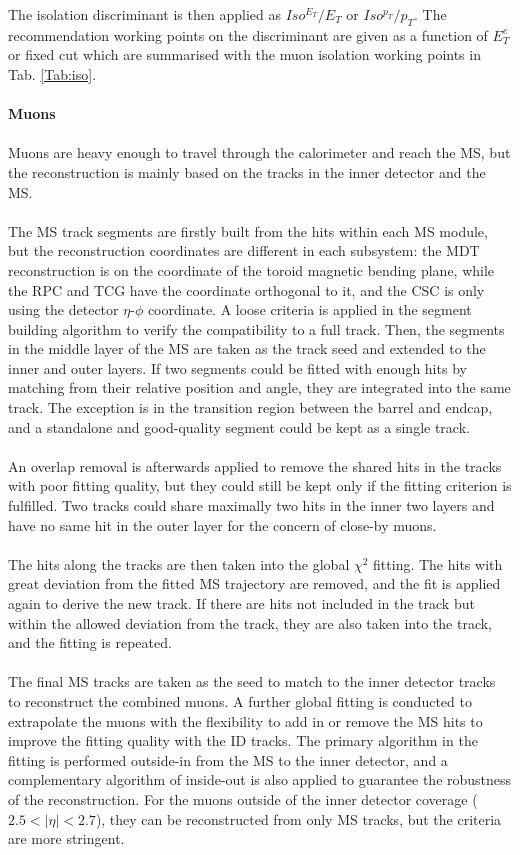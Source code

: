 The isolation discriminant is then applied as $Iso^{E_{T}}/E_{T}$ or $Iso^{p_T}/p_{T}$. The recommendation working points on the discriminant are given as a function of $E^{e}_{T}$ or fixed cut which are summarised with the muon isolation working points in Tab. \ref{Tab:iso}. 
\\
\\{\bf Muons \cite{Herde:2059849}}
\\
\\Muons are heavy enough to travel through the calorimeter and reach the MS, but the reconstruction is mainly based on the tracks in the inner detector and the MS. 
\\
\\The MS track segments are firstly built from the hits within each MS module, but the reconstruction coordinates are different in each subsystem: the MDT reconstruction is on the coordinate of the toroid magnetic bending plane, while the RPC and TCG have the coordinate orthogonal to it, and the CSC is only using the detector $\eta$-$\phi$ coordinate. A loose criteria is applied in the segment building algorithm to verify the compatibility to a full track. Then, the segments in the middle layer of the MS are taken as the track seed and extended to the inner and outer layers. If two segments could be fitted with enough hits by matching from their relative position and angle, they are integrated into the same track. The exception is in the transition region between the barrel and endcap, and a standalone and good-quality segment could be kept as a single track.  
\\
\\An overlap removal is afterwards applied to remove the shared hits in the tracks with poor fitting quality, but they could still be kept only if the fitting criterion is fulfilled. Two tracks could share maximally two hits in the inner two layers and have no same hit in the outer layer for the concern of close-by muons. 
\\
\\The hits along the tracks are then taken into the global $\chi^{2}$ fitting. The hits with great deviation from the fitted MS trajectory are removed, and the fit is applied again to derive the new track. If there are hits not included in the track but within the allowed deviation from the track, they are also taken into the track, and the fitting is repeated. 
\\
\\The final MS tracks are taken as the seed to match to the inner detector tracks to reconstruct the combined muons. A further global fitting is conducted to extrapolate the muons with the flexibility to add in or remove the MS hits to improve the fitting quality with the ID tracks. The primary algorithm in the fitting is performed outside-in from the MS to the inner detector, and a complementary algorithm of inside-out is also applied to guarantee the robustness of the reconstruction. For the muons outside of the inner detector coverage ($2.5<|\eta|<2.7$), they can be reconstructed from only MS tracks, but the criteria are more stringent. 
